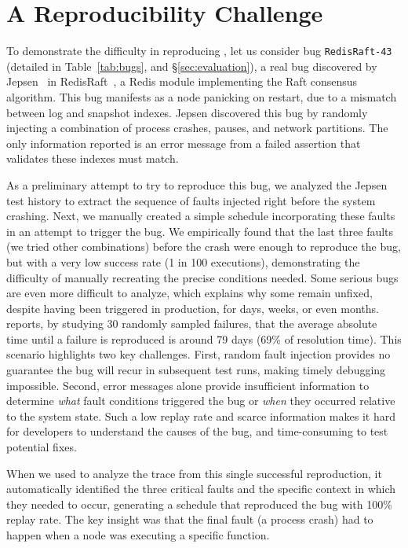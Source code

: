 \section{A Reproducibility Challenge}
\label{sec:motivation}

To demonstrate the difficulty in reproducing \efibshort, let us consider bug \texttt{RedisRaft-43}~\cite{redisraft43} (detailed in Table~\ref{tab:bugs}, and \S\ref{sec:evaluation}), a real bug discovered by Jepsen~\cite{jepsen} in RedisRaft~\cite{redisraft}, a Redis module implementing the Raft consensus algorithm.
This bug manifests as a node panicking on restart, due to a mismatch between log and snapshot indexes.
Jepsen discovered this bug by randomly injecting a combination of process crashes, pauses, and network partitions.
The only information reported is an error message from a failed assertion that validates these indexes must match.

As a preliminary attempt to try to reproduce this bug, we analyzed the Jepsen test history to extract the sequence of faults injected right before the system crashing.
Next, we manually created a simple schedule incorporating these faults in an attempt to trigger the bug. 
We empirically found that the last three faults (we tried other combinations) before the crash were enough to reproduce the bug, but with a very low success rate (1 in 100 executions), demonstrating the difficulty of manually recreating the precise conditions needed. Some serious bugs are even more difficult to analyze, which explains why some remain unfixed, despite having been triggered in production, for days, weeks, or even months. 
~\cite{pensieve} reports, by studying 30 randomly sampled failures, that the average absolute time until a failure is reproduced is around 79 days (69\% of resolution time).
This scenario highlights two key challenges.
First, random fault injection provides no guarantee the bug will recur in subsequent test runs, making timely debugging impossible. 
Second, error messages alone provide insufficient information to determine \emph{what} fault conditions triggered the bug or \emph{when} they occurred relative to the system state.
Such a low replay rate and scarce information makes it hard for developers to understand the causes of the bug, and time-consuming to test potential fixes.

When we used \sys to analyze the trace from this single successful reproduction, it automatically identified the three critical faults and the specific context in which they needed to occur, generating a schedule that reproduced the bug with 100\% replay rate.
The key insight was that the final fault (a process crash) had to happen when a node was executing a specific function.


